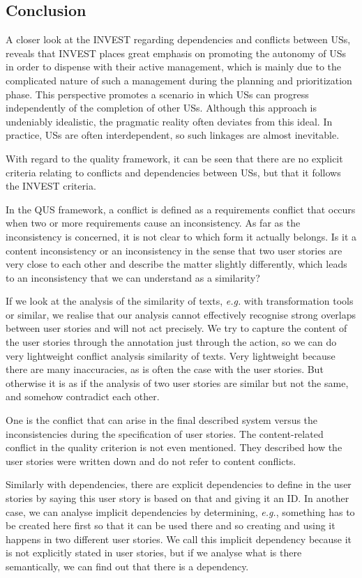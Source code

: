\subsection{Conclusion} \label{usq_conclusion}
A closer look at the INVEST regarding dependencies and conflicts between USs, reveals that INVEST places great emphasis on promoting the autonomy of USs in order to dispense with their active management, which is mainly due to the complicated nature of such a management during the planning and prioritization phase. This perspective promotes a scenario in which USs can progress independently of the completion of other USs. Although this approach is undeniably idealistic, the pragmatic reality often deviates from this ideal. In practice, USs are often interdependent, so such linkages are almost inevitable. 

With regard to the quality framework, it can be seen that there are no explicit criteria relating to conflicts and dependencies between USs, but that it follows the INVEST criteria.

In the QUS framework, a conflict is defined as a requirements conflict that occurs when two or more requirements cause an inconsistency. As far as the inconsistency is concerned, it is not clear to which form it actually belongs. Is it a content inconsistency or an inconsistency in the sense that two user stories are very close to each other and describe the matter slightly differently, which leads to an inconsistency that we can understand as a similarity?

If we look at the analysis of the similarity of texts, \emph{e.g.} with transformation tools or similar, we realise that our analysis cannot effectively recognise strong overlaps between user stories and will not act precisely. We try to capture the content of the user stories through the annotation just through the action, so we can do very lightweight conflict analysis similarity of texts. Very lightweight because there are many inaccuracies, as is often the case with the user stories. But otherwise it is as if the analysis of two user stories are similar but not the same, and somehow contradict each other. 

One is the conflict that can arise in the final described system versus the inconsistencies during the specification of user stories. The content-related conflict in the quality criterion is not even mentioned. They described how the user stories were written down and do not refer to content conflicts. 

Similarly with dependencies, there are explicit dependencies to define in the user stories by saying this user story is based on that and giving it an ID. In another case, we can analyse implicit dependencies by determining, \emph{e.g.}, something has to be created here first so that it can be used there and so creating and using it happens in two different user stories. We call this implicit dependency because it is not explicitly stated in user stories, but if we analyse what is there semantically, we can find out that there is a dependency. 

